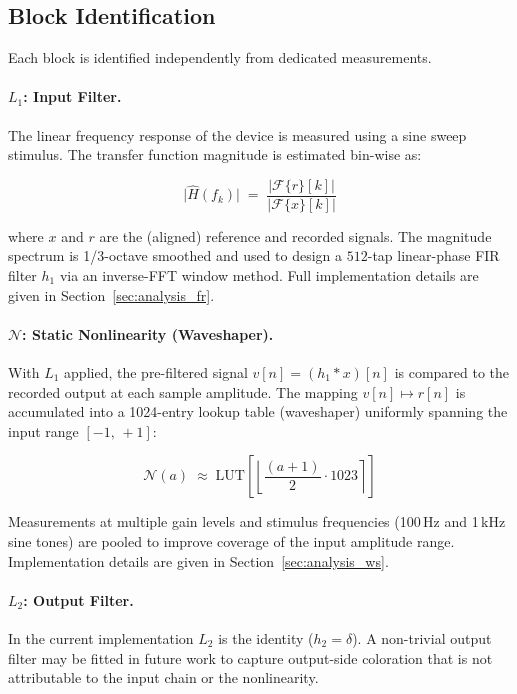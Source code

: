 \documentclass[11pt, letterpaper]{article}
\begin{document}
\subsection{Block Identification}
\label{sec:lnl_id}

Each block is identified independently from dedicated measurements.

\paragraph{$L_1$: Input Filter.}
The linear frequency response of the device is measured using a sine sweep
stimulus.  The transfer function magnitude is estimated bin-wise as:

\begin{equation}
    \bigl|\hat{H}(f_k)\bigr| \;=\;
    \frac{\bigl|\mathcal{F}\{r\}[k]\bigr|}{\bigl|\mathcal{F}\{x\}[k]\bigr|}
    \label{eq:fr_estimate}
\end{equation}

where $x$ and $r$ are the (aligned) reference and recorded signals.
The magnitude spectrum is 1/3-octave smoothed and used to design a
$512$-tap linear-phase FIR filter $h_1$ via an inverse-FFT window method.
Full implementation details are given in Section~\ref{sec:analysis_fr}.

\paragraph{$\mathcal{N}$: Static Nonlinearity (Waveshaper).}
With $L_1$ applied, the pre-filtered signal $v[n] = (h_1 * x)[n]$ is
compared to the recorded output at each sample amplitude.  The mapping
$v[n] \mapsto r[n]$ is accumulated into a 1024-entry lookup table
(waveshaper) uniformly spanning the input range $[-1,\,+1]$:

\begin{equation}
    \mathcal{N}(a) \;\approx\; \text{LUT}\!\left[
        \left\lfloor \frac{(a + 1)}{2} \cdot 1023 \right\rceil
    \right]
    \label{eq:waveshaper}
\end{equation}

Measurements at multiple gain levels and stimulus frequencies (100\,Hz and
1\,kHz sine tones) are pooled to improve coverage of the input amplitude range.
Implementation details are given in Section~\ref{sec:analysis_ws}.

\paragraph{$L_2$: Output Filter.}
In the current implementation $L_2$ is the identity ($h_2 = \delta$).
A non-trivial output filter may be fitted in future work to capture
output-side coloration that is not attributable to the input chain or
the nonlinearity.
\end{document}
